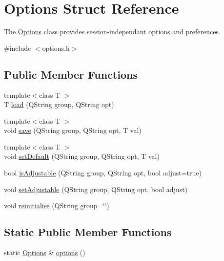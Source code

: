 \hypertarget{struct_options}{}\section{Options Struct Reference}
\label{struct_options}


The \hyperlink{struct_options}{Options} class provides session-\/independant options and preferences.  




{\ttfamily \#include $<$options.\+h$>$}

\subsection*{Public Member Functions}
\begin{DoxyCompactItemize}
\item 
{\footnotesize template$<$class T $>$ }\\T \hyperlink{struct_options_ada32d485296bd6ba73a1d95bd6260c1a}{load} (Q\+String group, Q\+String opt)
\item 
{\footnotesize template$<$class T $>$ }\\void \hyperlink{struct_options_ad20146ff9544f6229bb1696ea5bf643d}{save} (Q\+String group, Q\+String opt, T val)
\item 
{\footnotesize template$<$class T $>$ }\\void \hyperlink{struct_options_ab1d167bd93bce7dd453fcbb93acf12e4}{set\+Default} (Q\+String group, Q\+String opt, T val)
\item 
bool \hyperlink{struct_options_a1188a188db82d70c96af44679d2cbbf9}{is\+Adjustable} (Q\+String group, Q\+String opt, bool adjust=true)
\item 
void \hyperlink{struct_options_a086db8fe7688ddcb3b74db85262a5ba0}{set\+Adjustable} (Q\+String group, Q\+String opt, bool adjust)
\item 
void \hyperlink{struct_options_a336da0a8bbd1b849a1783bb110904d9f}{reinitialise} (Q\+String group=\char`\"{}\char`\"{})
\end{DoxyCompactItemize}
\subsection*{Static Public Member Functions}
\begin{DoxyCompactItemize}
\item 
static \hyperlink{struct_options}{Options} \& \hyperlink{struct_options_aa3dd7609fbc5d54af65992632bff842a}{options} ()
\end{DoxyCompactItemize}



